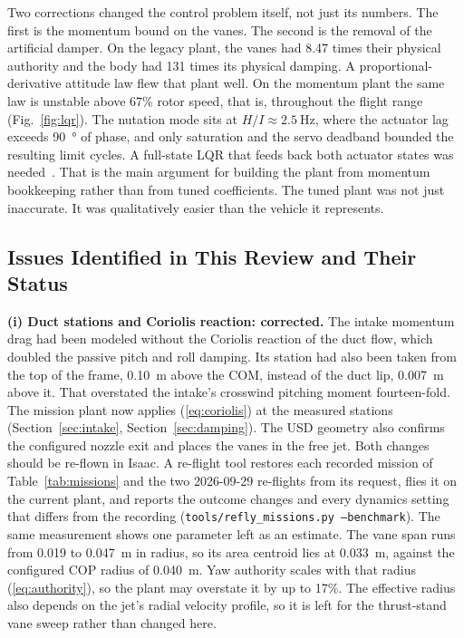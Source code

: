 \documentclass[journal]{IEEEtran}
\newcommand{\refeq}[1]{(\ref{#1})}
\newcommand{\reffig}[1]{Fig.~\ref{#1}}
\newcommand{\refsec}[1]{Section~\ref{#1}}
\newcommand{\reftab}[1]{Table~\ref{#1}}
\begin{document}
Two corrections changed the control problem itself, not just its numbers.
The first is the momentum bound on the vanes.
The second is the removal of the artificial damper.
On the legacy plant, the vanes had 8.47 times their physical authority and the body had 131 times its physical damping.
A proportional-derivative attitude law flew that plant well.
On the momentum plant the same law is unstable above 67\% rotor speed, that is, throughout the flight range (\reffig{fig:lqr}).
The nutation mode sits at $H/I \approx \SI{2.5}{\hertz}$, where the actuator lag exceeds \SI{90}{\degree} of phase, and only saturation and the servo deadband bounded the resulting limit cycles.
A full-state LQR that feeds back both actuator states was needed~\cite{tang2026rl}.
That is the main argument for building the plant from momentum bookkeeping rather than from tuned coefficients.
The tuned plant was not just inaccurate.
It was qualitatively easier than the vehicle it represents.

\subsection{Issues Identified in This Review and Their Status}
\label{sec:issues}

\textbf{(i) Duct stations and Coriolis reaction: corrected.}
The intake momentum drag had been modeled without the Coriolis reaction of the duct flow, which doubled the passive pitch and roll damping.
Its station had also been taken from the top of the frame, \SI{0.10}{\metre} above the COM, instead of the duct lip, \SI{0.007}{\metre} above it.
That overstated the intake's crosswind pitching moment fourteen-fold.
The mission plant now applies \refeq{eq:coriolis} at the measured stations (\refsec{sec:intake}, \refsec{sec:damping}).
The USD geometry also confirms the configured nozzle exit and places the vanes in the free jet.
Both changes should be re-flown in Isaac.
A re-flight tool restores each recorded mission of \reftab{tab:missions} and the two 2026-09-29 re-flights from its request, flies it on the current plant, and reports the outcome changes and every dynamics setting that differs from the recording (\texttt{tools/refly\_missions.py --benchmark}).
The same measurement shows one parameter left as an estimate.
The vane span runs from \SI{0.019}{} to \SI{0.047}{\metre} in radius, so its area centroid lies at \SI{0.033}{\metre}, against the configured COP radius of \SI{0.040}{\metre}.
Yaw authority scales with that radius \refeq{eq:authority}, so the plant may overstate it by up to 17\%.
The effective radius also depends on the jet's radial velocity profile, so it is left for the thrust-stand vane sweep rather than changed here.
\end{document}

